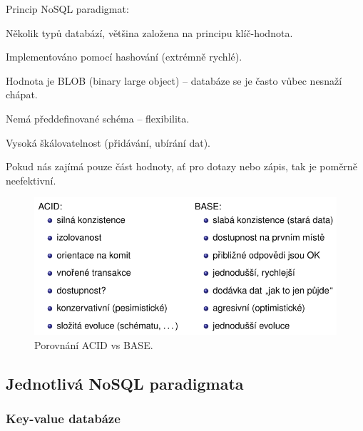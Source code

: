\begin{compactitem}
    \item Princip NoSQL paradigmat: \begin{compactitem}
        \item Několik typů databází, většina založena na principu klíč-hodnota.
        \item Implementováno pomocí hashování (extrémně rychlé).
        \item Hodnota je BLOB (binary large object) -- databáze se je často vůbec nesnaží chápat.
        \item Nemá předdefinované schéma -- flexibilita.
        \item Vysoká škálovatelnost (přidávání, ubírání dat).
        \item Pokud nás zajímá pouze část hodnoty, ať pro dotazy nebo zápis, tak je poměrně neefektivní.
    \end{compactitem}
\end{compactitem}

\begin{figure}[H]
    \centering
    \includegraphics[width=1\linewidth]{acid-vs-base.pdf}
    \caption{Porovnání ACID vs BASE.}
\end{figure}

\subsection{Jednotlivá NoSQL paradigmata}

\subsubsection*{Key-value databáze}

